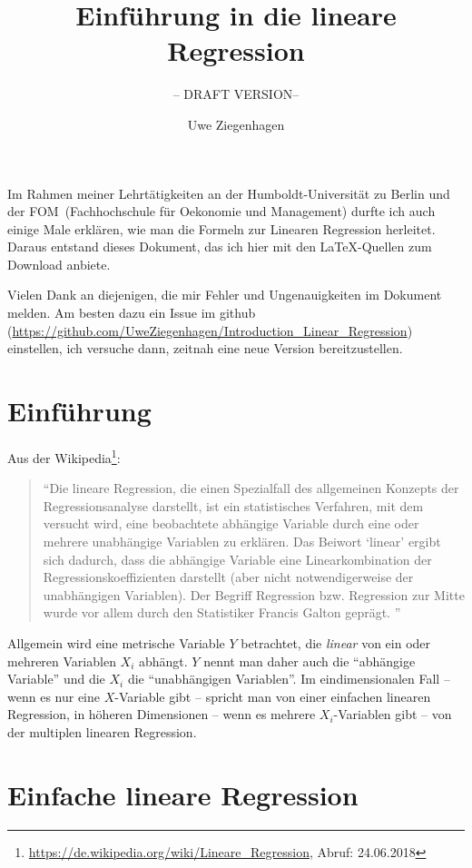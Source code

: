 \documentclass[ngerman, 12pt,parskip=half]{scrartcl}
\title{Einführung in die lineare Regression}
\subtitle{-- DRAFT VERSION--}
\author{Uwe Ziegenhagen}
\begin{document}
\maketitle


Im Rahmen meiner Lehrtätigkeiten an der Humboldt-Universität zu Berlin und der FOM~(Fachhochschule für Oekonomie und Management) durfte ich auch einige Male erklären, wie man die Formeln zur Linearen Regression herleitet. Daraus entstand dieses Dokument, das ich hier mit den \LaTeX-Quellen zum Download anbiete.

Vielen Dank an diejenigen, die mir Fehler und Ungenauigkeiten im Dokument melden. Am besten dazu ein Issue im github (\url{https://github.com/UweZiegenhagen/Introduction_Linear_Regression}) einstellen, ich versuche dann, zeitnah eine neue Version bereitzustellen.

\tableofcontents


\section{Einführung}

Aus der Wikipedia\footnote{\url{https://de.wikipedia.org/wiki/Lineare_Regression}, Abruf: 24.06.2018}: 

\begin{quote}
\enquote{Die lineare Regression, die einen Spezialfall des allgemeinen Konzepts der Regressionsanalyse darstellt, ist ein statistisches Verfahren, mit dem versucht wird, eine beobachtete abhängige Variable durch eine oder mehrere unabhängige Variablen zu erklären. 
Das Beiwort \enquote{linear} ergibt sich dadurch, dass die abhängige Variable eine Linearkombination der Regressionskoeffizienten darstellt (aber nicht notwendigerweise der unabhängigen Variablen).
Der Begriff Regression bzw. Regression zur Mitte wurde vor allem durch den Statistiker Francis Galton geprägt. 
}\end{quote}

Allgemein wird eine metrische Variable \(Y\) betrachtet, die \textit{linear} von ein oder mehreren Variablen \(X_i\) abhängt.
\(Y\) nennt man daher auch die \enquote{abhängige Variable} und die \(X_i\) die \enquote{unabhängigen Variablen}.
Im eindimensionalen Fall -- wenn es nur eine \(X\)-Variable gibt -- spricht man von einer einfachen linearen Regression, in höheren Dimensionen -- wenn es mehrere \(X_i\)-Variablen gibt --  von der multiplen linearen Regression.

\section{Einfache lineare Regression}
\end{document}
